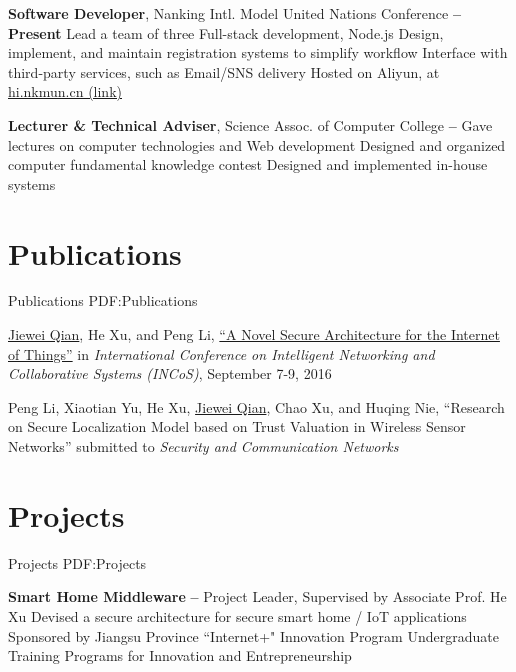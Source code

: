 \documentclass[a4paper,MMMyyyy,nonstop]{simpleresumecv}
\begin{document}
\begin{body}
\textbf{Software Developer}, Nanking Intl. Model United Nations Conference
\hfill \textbf{
      -- Present
}
\BulletItem
Lead a team of three
\BulletItem
Full-stack development, Node.js
\BulletItem
Design, implement, and maintain registration systems to simplify workflow
\BulletItem
Interface with third-party services, such as Email/SNS delivery
\BulletItem
Hosted on Aliyun, at \href{https://hi.nkmun.cn/}{hi.nkmun.cn (link)}

\GapNoBreak

\textbf{Lecturer \& Technical Adviser}, Science Assoc. of Computer College
\hfill \textbf{
     -- 
}
\BulletItem
Gave lectures on computer technologies and Web development
\BulletItem
Designed and organized computer fundamental knowledge contest
\BulletItem
Designed and implemented in-house systems


\section
{Publications}
{Publications}
{PDF:Publications}

\BulletItem
\underline{Jiewei Qian}, He Xu, and Peng Li,
\href{http://ieeexplore.ieee.org/document/7695208/}{``A Novel Secure Architecture for the Internet of Things''}{}
in \textit{International Conference on Intelligent Networking and Collaborative Systems (INCoS)}, September 7-9, 2016

\GapNoBreak

\BulletItem
Peng Li, Xiaotian Yu, He Xu, \underline{Jiewei Qian}, Chao Xu, and Huqing Nie,
``Research on Secure Localization Model based on Trust Valuation in Wireless Sensor Networks''
submitted to \textit{Security and Communication Networks}


\section
{Projects}
{Projects}
{PDF:Projects}

\textbf{Smart Home Middleware}
\hfill \textbf{  --  }
\BulletItem
Project Leader, Supervised by Associate Prof. He Xu
\BulletItem
Devised a secure architecture for secure smart home / IoT applications
\BulletItem
Sponsored by Jiangsu Province ``Internet+" Innovation Program
\BulletItem
Undergraduate Training Programs for Innovation and Entrepreneurship


\end{body}
\end{document}
